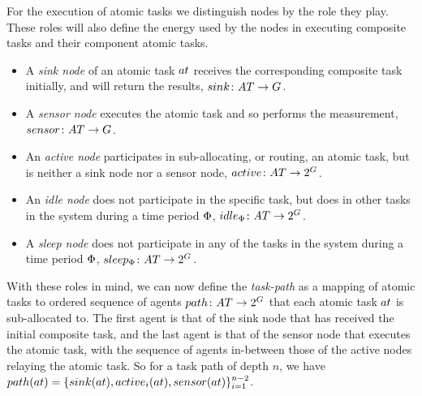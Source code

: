 \newcommand{\functionSenseRole}[2]{\functionSignature{sensor}{\varAtomicTask{}{}}}
\newcommand{\functionActiveRole}[2]{\functionSignature{active_{#1}}{\varAtomicTask{}{}}}
\newcommand{\functionIdleRole}[2]{\functionSignature{idle}{\varAtomicTask{}{}}}
\newcommand{\functionSleepRole}[2]{\functionSignature{sleep}{\varAtomicTask{}{}}}
For the execution of atomic tasks we distinguish nodes by the role they play. These roles will also define the energy used by the nodes in executing composite tasks and their component atomic tasks.
\begin{itemize}
	\item A \textit{sink node} of an atomic task $\varAtomicTask{}{}$ receives the corresponding composite task initially, and will return the results, $\formalSinkRole{}{}$.
	\item A \textit{sensor node} executes the atomic task and so performs the measurement, $\formalSenseRole{}{}$.
	\item An \textit{active node} participates in sub-allocating, or routing, an atomic task, but is neither a sink node nor a sensor node, $\formalActiveRole{}{}$.
	\item An \textit{idle node} does not participate in the specific task, but does in other tasks in the system during a time period $\Phi$, $\formalIdleRole{}{}$.
	\item A \textit{sleep node} does not participate in any of the tasks in the system during a time period $\Phi$, $\formalSleepRole{}{}$.
\end{itemize}
With these roles in mind, we can now define the  \textit{task-path} as a mapping of atomic tasks to ordered sequence of agents $\formalTaskArc{}{}$ that each atomic task $\varAtomicTask{}{}$ is sub-allocated to. The first agent is that of the sink node that has received the initial composite task, and the last agent is that of the sensor node that executes the atomic task, with the sequence of agents in-between those of the active nodes relaying the atomic task. So for a task path of depth $n$, we have
$\functionTaskArc{}{} = \lbrace \functionSinkRole{}{}, \functionActiveRole{i}{}, \functionSenseRole{}{} \rbrace_{i=1}^{n-2}$. 
